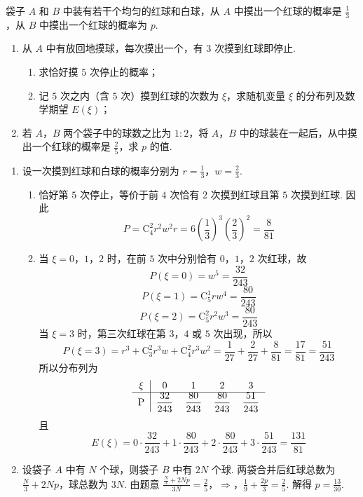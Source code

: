 \begin{problem}
袋子 \(A\) 和 \(B\) 中装有若干个均匀的红球和白球，从 \(A\) 中摸出一个红球的概率是 \(\frac{1}{3}\)，从 \(B\) 中摸出一个红球的概率为 \(p\).
\begin{enumerate}
\item 从 \(A\) 中有放回地摸球，每次摸出一个，有 \(3\) 次摸到红球即停止.
\begin{enumerate}
\item 求恰好摸 \(5\) 次停止的概率；
\item 记 \(5\) 次之内（含 \(5\) 次）摸到红球的次数为 \(\xi\)，求随机变量 \(\xi\) 的分布列及数学期望 \(E(\xi)\)；
\end{enumerate}
\item 若 \(A\)，\(B\) 两个袋子中的球数之比为 \(1:2\)，将 \(A\)，\(B\) 中的球装在一起后，从中摸出一个红球的概率是 \(\frac{2}{5}\)，求 \(p\) 的值.
\end{enumerate}

\begin{solution}
\begin{enumerate}
\item 设一次摸到红球和白球的概率分别为 \(r=\frac13\)，\(w=\frac23\).
\begin{enumerate}
\item 恰好第 \(5\) 次停止，等价于前 \(4\) 次恰有 \(2\) 次摸到红球且第 \(5\) 次摸到红球. 因此
\[
P=\mathrm C_4^2r^2w^2r
=6\left(\frac13\right)^3\left(\frac23\right)^2
=\frac{8}{81}
\]

\item 当 \(\xi=0\)，\(1\)，\(2\) 时，在前 \(5\) 次中分别恰有 \(0\)，\(1\)，\(2\) 次红球，故
\[
P(\xi=0)=w^5=\frac{32}{243}
\]
\[
P(\xi=1)=\mathrm C_5^1rw^4=\frac{80}{243}
\]
\[
P(\xi=2)=\mathrm C_5^2r^2w^3=\frac{80}{243}
\]
当 \(\xi=3\) 时，第三次红球在第 \(3\)，\(4\) 或 \(5\) 次出现，所以
\[
P(\xi=3)=r^3+\mathrm C_3^2r^3w+\mathrm C_4^2r^3w^2
=\frac{1}{27}+\frac{2}{27}+\frac{8}{81}
=\frac{17}{81}=\frac{51}{243}
\]
所以分布列为
\[
\begin{tabular}{c|cccc}
\(\xi\) & \(0\) & \(1\) & \(2\) & \(3\) \\
\hline
P & \(\dfrac{32}{243}\) & \(\dfrac{80}{243}\) & \(\dfrac{80}{243}\) & \(\dfrac{51}{243}\)
\end{tabular}
\]
且
\[
E(\xi)=0\cdot\frac{32}{243}+1\cdot\frac{80}{243}+2\cdot\frac{80}{243}+3\cdot\frac{51}{243}=\frac{131}{81}
\]
\end{enumerate}

\item 设袋子 \(A\) 中有 \(N\) 个球，则袋子 \(B\) 中有 \(2N\) 个球. 两袋合并后红球总数为
\(\frac N3+2Np\)，球总数为 \(3N\). 由题意
\(\frac{\frac N3+2Np}{3N}=\frac25\)，\(\Longrightarrow\)，\(\frac19+\frac{2p}{3}=\frac25\).
解得 \(p=\frac{13}{30}\).
\end{enumerate}
\end{solution}
\end{problem}

